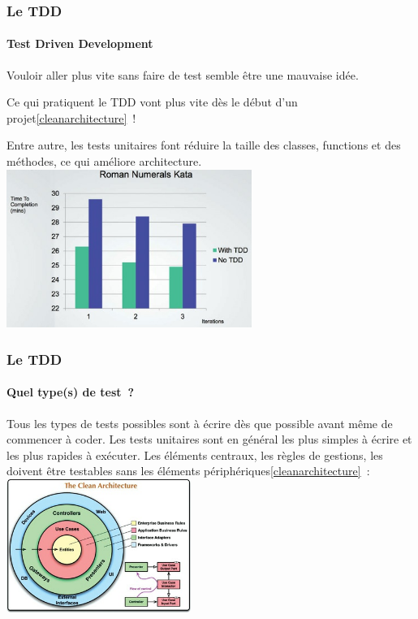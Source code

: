 \documentclass{beamer}
\begin{document}
    \begin{frame}
        \transdissolve
        \frametitle{Le TDD}
        \framesubtitle{Test Driven Development}
        Vouloir aller plus vite sans faire de test semble être une mauvaise idée.

        Ce qui pratiquent le TDD vont plus vite dès le début d'un projet\cref{cleanarchitecture}~!

        Entre autre, les tests unitaires font réduire la taille des classes, functions et des méthodes, ce qui améliore architecture.
        \bigbreak
        \centering
        \includegraphics[width=8cm]{image/tdd-vs-no-tdd}
    \end{frame}

    \begin{frame}
        \transdissolve
        \frametitle{Le TDD}
        \framesubtitle{Quel type(s) de test~?}
        Tous les types de tests possibles sont à écrire dès que possible avant même de commencer à coder.
        Les tests unitaires sont en général les plus simples à écrire et les plus rapides à exécuter.
        \bigbreak
        Les éléments centraux, les règles de gestions, les  doivent être testables sans les éléments périphériques\cref{cleanarchitecture}~:
        \bigbreak
        \centering
        \includegraphics[width=6cm]{image/the-clean-architecture}
    \end{frame}
\end{document}
